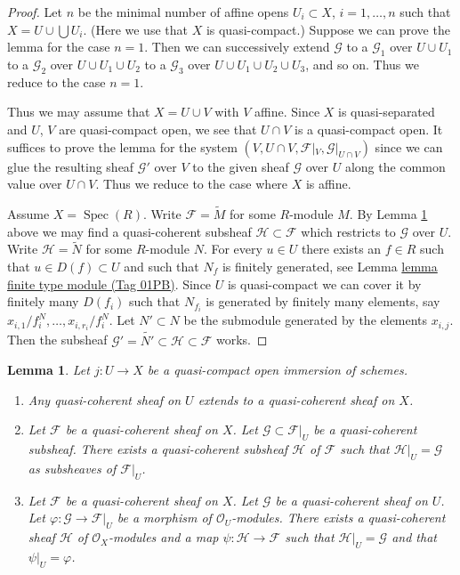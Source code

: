 \documentclass{amsart}
\theoremstyle{plain}
\newtheorem{lemma}[subsection]{Lemma}
\theoremstyle{definition}
\theoremstyle{remark}
\numberwithin{equation}{subsection}
\def\Spec{\mathop{\mathrm{Spec}}}
\begin{document}
\begin{proof}
Let $n$ be the minimal number of affine opens $U_i \subset X$,
$i = 1, \ldots , n$ such that $X = U \cup \bigcup U_i$.
(Here we use that $X$ is quasi-compact.) Suppose
we can prove the lemma for the case $n = 1$. Then we can successively
extend $\mathcal{G}$
to a $\mathcal{G}_1$ over $U \cup U_1$
to a $\mathcal{G}_2$ over $U \cup U_1 \cup U_2$
to a $\mathcal{G}_3$ over $U \cup U_1 \cup U_2 \cup U_3$,
and so on.
Thus we reduce to the case $n = 1$.

\medskip\noindent
Thus we may assume that $X = U \cup V$ with $V$ affine.
Since $X$ is quasi-separated and $U$, $V$ are quasi-compact open,
we see that $U \cap V$ is a quasi-compact open. It suffices to prove the
lemma for the system $(V, U \cap V, \mathcal{F}|_V, \mathcal{G}|_{U \cap V})$
since we can glue the resulting sheaf $\mathcal{G}'$ over $V$
to the given sheaf $\mathcal{G}$ over $U$ along the common value
over $U \cap V$.
Thus we reduce to the case where $X$ is affine.

\medskip\noindent
Assume $X = \Spec(R)$. Write $\mathcal{F} = \widetilde M$
for some $R$-module $M$. By Lemma \ref{properties-lemma-extend-trivial} above we may
find a quasi-coherent subsheaf $\mathcal{H} \subset \mathcal{F}$
which restricts to $\mathcal{G}$ over $U$.
Write $\mathcal{H} = \widetilde N$ for some $R$-module $N$.
For every $u \in U$ there exists an $f \in R$ such that
$u \in D(f) \subset U$ and such that $N_f$ is finitely generated,
see Lemma \href{https://stacks.math.columbia.edu/tag/01PB}{lemma finite type module (Tag 01PB)}.
Since $U$ is quasi-compact we can cover it by finitely
many $D(f_i)$ such that $N_{f_i}$ is generated by
finitely many elements, say $x_{i, 1}/f_i^N, \ldots, x_{i, r_i}/f_i^N$.
Let $N' \subset N$ be the submodule generated by the elements
$x_{i, j}$. Then the subsheaf
$\mathcal{G}' = \widetilde{N'} \subset \mathcal{H} \subset \mathcal{F}$
works.
\end{proof}


\begin{lemma}
\label{properties-lemma-extend-trivial}
Let $j : U \to X$ be a quasi-compact open immersion of schemes.
\begin{enumerate}
\item Any quasi-coherent sheaf on $U$ extends to a quasi-coherent
sheaf on $X$.
\item Let $\mathcal{F}$ be a quasi-coherent sheaf on $X$.
Let $\mathcal{G} \subset \mathcal{F}|_U$ be a quasi-coherent
subsheaf. There exists a quasi-coherent subsheaf $\mathcal{H}$ of
$\mathcal{F}$ such that $\mathcal{H}|_U = \mathcal{G}$
as subsheaves of $\mathcal{F}|_U$.
\item Let $\mathcal{F}$ be a quasi-coherent sheaf on $X$.
Let $\mathcal{G}$ be a quasi-coherent sheaf on $U$.
Let $\varphi : \mathcal{G} \to \mathcal{F}|_U$ be a morphism
of $\mathcal{O}_U$-modules. There exists a quasi-coherent sheaf $\mathcal{H}$
of $\mathcal{O}_X$-modules and a map $\psi : \mathcal{H} \to \mathcal{F}$
such that $\mathcal{H}|_U = \mathcal{G}$ and that
$\psi|_U = \varphi$.
\end{enumerate}
\end{lemma}
\end{document}
